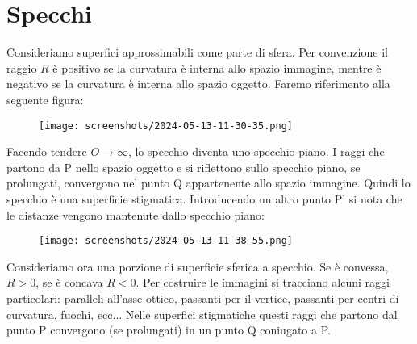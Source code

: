 \section{Specchi}
Consideriamo superfici approssimabili come parte di sfera. Per convenzione il raggio \(R\) è positivo se la curvatura è interna allo spazio immagine, mentre è negativo se la curvatura è interna allo spazio oggetto. Faremo riferimento alla seguente figura:
\begin{figure}[H]
	\centering
	\texttt{[image: screenshots/2024-05-13-11-30-35.png]}
\end{figure}
Facendo tendere \(O \to \infty \), lo specchio diventa uno specchio piano. I raggi che partono da P nello spazio oggetto e si riflettono sullo specchio piano, se prolungati, convergono nel punto Q appartenente allo spazio immagine. Quindi lo specchio è una superficie stigmatica. Introducendo un altro punto P' si nota che le distanze vengono mantenute dallo specchio piano:
\begin{figure}[H]
	\centering
	\texttt{[image: screenshots/2024-05-13-11-38-55.png]}
\end{figure}
Consideriamo ora una porzione di superficie sferica a specchio. Se è convessa, \(R>0\), se è concava \(R<0\). Per costruire le immagini si tracciano alcuni raggi particolari: paralleli all'asse ottico, passanti per il vertice, passanti per centri di curvatura, fuochi, ecc... Nelle superfici stigmatiche questi raggi che partono dal punto P convergono (se prolungati) in un punto Q coniugato a P.

